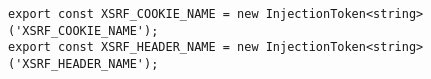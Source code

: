 \begin{verbatim}
export const XSRF_COOKIE_NAME = new InjectionToken<string>('XSRF_COOKIE_NAME');
export const XSRF_HEADER_NAME = new InjectionToken<string>('XSRF_HEADER_NAME');
\end{verbatim}
